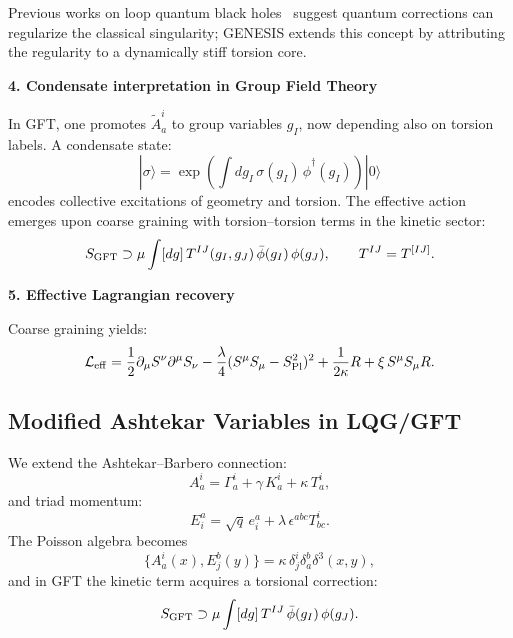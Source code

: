\documentclass{article}
\newcommand{\Splanck}{S_{\mathrm{Pl}}}
\begin{document}
Previous works on loop quantum black holes~\cite{barrau2014} suggest quantum corrections can regularize the classical singularity; GENESIS extends this concept by attributing the regularity to a dynamically stiff torsion core.


\vspace{1em}
\noindent\textbf{4. Condensate interpretation in Group Field Theory}

In GFT, one promotes \( \tilde A^i_a \) to group variables \( g_I \), now depending also on torsion labels. A condensate state:
\[
  |\sigma\rangle = \exp\left( \int dg_I\,\sigma(g_I)\,\hat\phi^\dagger(g_I) \right) |0\rangle
\]
encodes collective excitations of geometry and torsion. The effective action emerges upon coarse graining with torsion–torsion terms in the kinetic sector:
\[
  S_{\rm GFT} \supset \mu \int [dg]\,T^{IJ}(g_I, g_J)\,\bar\phi(g_I)\,\phi(g_J),
\qquad
  T^{IJ} = T^{[IJ]}.
\]

\vspace{1em}
\noindent\textbf{5. Effective Lagrangian recovery}

Coarse graining yields:
\[
  \mathcal{L}_{\rm eff} = \frac{1}{2} \partial_\mu S^\nu \partial^\mu S_\nu - \frac{\lambda}{4} (S^\mu S_\mu - \Splanck^2)^2 + \frac{1}{2\kappa} R + \xi\,S^\mu S_\mu R.
\]

\vspace{1em}
\begin{center}
\end{center}
\medskip



\subsection{Modified Ashtekar Variables in LQG/GFT}

We extend the Ashtekar–Barbero connection:
\[
  A^i_a = \Gamma^i_a + \gamma\,K^i_a + \kappa\,T^i_a,
\]
and triad momentum:
\[
  E^a_i = \sqrt{q}\,e^a_i + \lambda\,\epsilon^{abc}T_{bc}^i.
\]
The Poisson algebra becomes
\[
  \{A^i_a(x),E^b_j(y)\}=\kappa\,\delta^i_j\delta^b_a\delta^3(x,y),
\]
and in GFT the kinetic term acquires a torsional correction:
\[
  S_{\rm GFT}\supset \mu\int [dg]\,T^{IJ}\,\bar\phi(g_I)\,\phi(g_J).
\]
\end{document}
